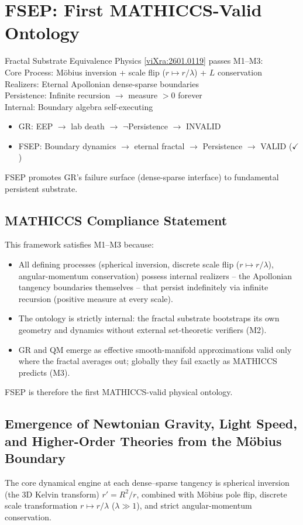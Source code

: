 \documentclass[11pt,a4paper]{article}
\begin{document}
\section{FSEP: First MATHICCS-Valid Ontology}
Fractal Substrate Equivalence Physics [\href{https://vixra.org/abs/2601.0119}{viXra:2601.0119}] passes M1--M3:\\
Core Process: M\"obius inversion + scale flip ($r\mapsto r/\lambda$) + $L$ conservation\\
Realizers: Eternal Apollonian dense-sparse boundaries\\
Persistence: Infinite recursion $\to$ measure $>0$ forever\\
Internal: Boundary algebra self-executing
\begin{itemize}
\item GR: EEP $\to$ lab death $\to$ $\neg$Persistence $\to$ INVALID
\item FSEP: Boundary dynamics $\to$ eternal fractal $\to$ Persistence $\to$ VALID ($\checkmark$)
\end{itemize}
FSEP promotes GR's failure surface (dense-sparse interface) to fundamental persistent substrate.

\subsection{MATHICCS Compliance Statement}
This framework satisfies M1--M3 because:
\begin{itemize}
\item All defining processes (spherical inversion, discrete scale flip ($r\mapsto r/\lambda$), angular-momentum conservation) possess internal realizers -- the Apollonian tangency boundaries themselves -- that persist indefinitely via infinite recursion (positive measure at every scale).
\item The ontology is strictly internal: the fractal substrate bootstraps its own geometry and dynamics without external set-theoretic verifiers (M2).
\item GR and QM emerge as effective smooth-manifold approximations valid only where the fractal averages out; globally they fail exactly as MATHICCS predicts (M3).
\end{itemize}
FSEP is therefore the first MATHICCS-valid physical ontology.

\subsection{Emergence of Newtonian Gravity, Light Speed, and Higher-Order Theories from the M\"obius Boundary}
The core dynamical engine at each dense--sparse tangency is spherical inversion (the 3D Kelvin transform) $r' = R^2 / r$, combined with M\"obius pole flip, discrete scale transformation $r \mapsto r/\lambda$ ($\lambda\gg 1$), and strict angular-momentum conservation.
\end{document}

